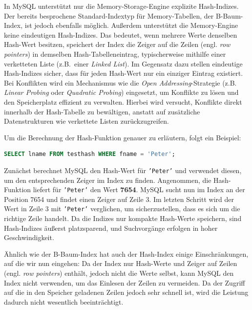In MySQL unterstützt nur die Memory-Storage-Engine explizite Hash-Indizes.
Der bereits besprochene Standard-Indextyp für Memory-Tabellen, der B-Baum-Index, ist jedoch ebenfalls möglich.
Außerdem unterstützt die Memory-Engine keine eindeutigen Hash-Indizes.
Das bedeutet, wenn mehrere Werte denselben Hash-Wert besitzen, speichert der Index die Zeiger auf die Zeilen (engl. \textit{row pointers}) in demselben Hash-Tabelleneintrag, typischerweise mithilfe einer verketteten Liste (z.B.\ einer \textit{Linked List}).
Im Gegensatz dazu stellen eindeutige Hash-Indizes sicher, dass für jeden Hash-Wert nur ein einziger Eintrag existiert.
Bei Konflikten wird ein Mechanismus wie die \textit{Open Addressing}-Strategie (z.B. \textit{Linear Probing} oder \textit{Quadratic Probing}) eingesetzt, um Konflikte zu lösen und den Speicherplatz effizient zu verwalten.
Hierbei wird versucht, Konflikte direkt innerhalb der Hash-Tabelle zu bewältigen, anstatt auf zusätzliche Datenstrukturen wie verkettete Listen zurückzugreifen.

Um die Berechnung der Hash-Funktion genauer zu erläutern, folgt ein Beispiel:

\begin{lstlisting}[language=SQL,caption=Variationen,label={lst:select-query-hash}]
SELECT lname FROM testhash WHERE fname = 'Peter';
\end{lstlisting}

Zunächst berechnet MySQL den Hash-Wert für \texttt{'Peter'} und verwendet diesen, um den entsprechenden Zeiger im Index zu finden.
Angenommen, die Hash-Funktion liefert für \texttt{'Peter'} den Wert \textbf{7654}.
MySQL sucht nun im Index an der Position 7654 und findet einen Zeiger auf Zeile 3.
Im letzten Schritt wird der Wert in Zeile 3 mit \texttt{'Peter'} verglichen, um sicherzustellen, dass es sich um die richtige Zeile handelt.
Da die Indizes nur kompakte Hash-Werte speichern, sind Hash-Indizes äußerst platzsparend, und Suchvorgänge erfolgen in hoher Geschwindigkeit.

Ähnlich wie der B-Baum-Index hat auch der Hash-Index einige Einschränkungen, auf die wir nun eingehen:
Da der Index nur Hash-Werte und Zeiger auf Zeilen (engl. \textit{row pointers}) enthält, jedoch nicht die Werte selbst, kann MySQL den Index nicht verwenden, um das Einlesen der Zeilen zu vermeiden.
Da der Zugriff auf die in den Speicher geladenen Zeilen jedoch sehr schnell ist, wird die Leistung dadurch nicht wesentlich beeinträchtigt.

